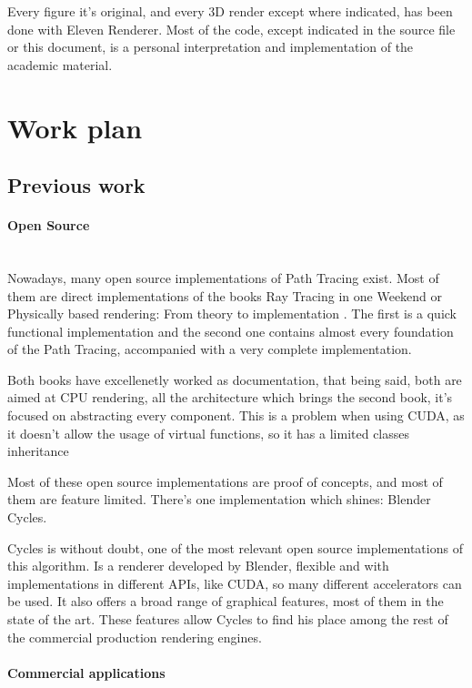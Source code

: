 Every figure it's original, and every 3D render except where indicated, has been done with Eleven Renderer. Most of the code, except indicated in the source file or this document, is a personal interpretation and implementation of the academic material.


\section{Work plan}
	
\subsection{Previous work}

\paragraph{Open Source}\mbox{} \\

Nowadays, many open source implementations of Path Tracing exist. Most of them are direct implementations of the books Ray Tracing in one Weekend \cite{shirley2016ray} or Physically based rendering: From theory to implementation \cite{pharr2016physically}. The first is a quick functional implementation and the second one contains almost every foundation of the Path Tracing, accompanied with a very complete implementation.

Both books have excellenetly worked as documentation, that being said, both are aimed at CPU rendering, all the architecture which brings the second book, it's focused on abstracting every component. This is a problem when using CUDA, as it doesn't allow the usage of virtual functions, so it has a limited classes inheritance 

Most of these open source implementations are proof of concepts, and most of them are feature limited. There's one implementation which shines: Blender Cycles.

Cycles is without doubt, one of the most relevant open source implementations of this algorithm. Is a renderer developed by Blender, flexible and with implementations in different APIs, like CUDA, so many different accelerators can be used. It also offers a broad range of graphical features, most of them in the state of the art. These features allow Cycles to find his place among the rest of the commercial production rendering engines.

\paragraph{Commercial applications}\mbox{} \\

